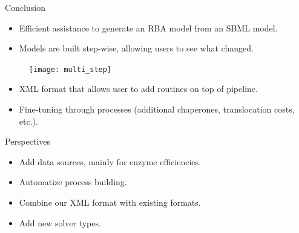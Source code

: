 \documentclass{beamer}
\begin{document}
\begin{frame}{Conclusion}
  \begin{itemize}
    \item Efficient assistance to generate an RBA model from an SBML model.
    \item Models are built step-wise, allowing users to see what changed.
  \end{itemize}
  \begin{figure}
    \centering
    \texttt{[image: multi\_step]}
  \end{figure}
  \begin{itemize}
    \item XML format that allows user to add routines on top of pipeline.
    \item Fine-tuning through processes (additional chaperones, translocation
    costs, etc.).
  \end{itemize}
\end{frame}

\begin{frame}{Perspectives}
  \begin{itemize}
    \item Add data sources, mainly for enzyme efficiencies.
    \item Automatize process building.
    \item Combine our XML format with existing formats.
    \item Add new solver types.
  \end{itemize}
\end{frame}


\appendix
{}
\setcounter{finalframe}{\value{framenumber}}


\setcounter{framenumber}{\value{finalframe}}
\end{document}

